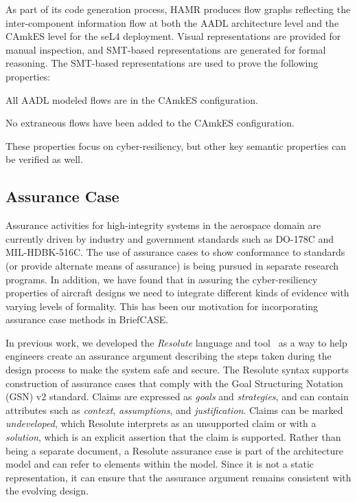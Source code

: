 As part of its code generation process, HAMR produces flow graphs reflecting the inter-component information flow at both the AADL architecture level and the CAmkES level for the seL4 deployment.  
Visual representations are provided for manual inspection, and SMT-based representations are generated for formal reasoning.
The SMT-based representations are used to prove the following properties:
\begin{compactenum}
\item All AADL modeled flows are in the CAmkES configuration. 
\item No extraneous flows have been added to the CAmkES configuration.
\end{compactenum}
These properties focus on cyber-resiliency, but other key semantic properties can be verified as well.

\subsection{Assurance Case}

Assurance activities for high-integrity systems in the aerospace domain are currently driven by industry and government standards such as DO-178C and MIL-HDBK-516C.
The use of assurance cases to show conformance to standards (or provide alternate means of assurance) is being pursued in separate research programs.  
In addition, we have found that in assuring the cyber-resiliency properties of aircraft designs we need to integrate different kinds of evidence with varying levels of formality.
This has been our motivation for incorporating assurance case methods in BriefCASE.

In previous work, we developed the {\em Resolute} language and tool~\cite{resolute-destion} as a way to help engineers create an assurance argument describing the steps taken during the design process to make the system safe and secure.
The Resolute syntax supports construction of assurance cases that comply with the Goal Structuring
Notation (GSN) v2 standard.
Claims are expressed as \textit{goals} and \textit{strategies}, and can contain attributes such as \textit{context}, \textit{assumptions}, and \textit{justification}.
Claims can be marked \textit{undeveloped}, which Resolute interprets as an unsupported claim or with a \textit{solution}, which is an explicit assertion that the claim is supported.
Rather than being a separate document, a Resolute assurance case is part of the architecture model and can refer to elements within the model.
Since it is not a static representation, it can ensure that the assurance argument remains consistent with the evolving
design.  

